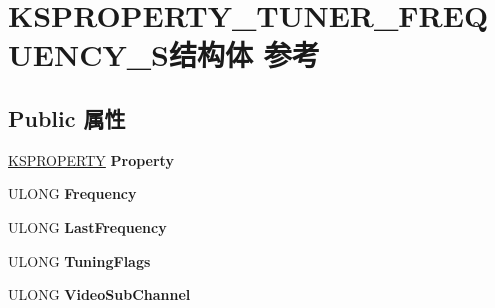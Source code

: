 \hypertarget{struct_k_s_p_r_o_p_e_r_t_y___t_u_n_e_r___f_r_e_q_u_e_n_c_y___s}{}\section{K\+S\+P\+R\+O\+P\+E\+R\+T\+Y\+\_\+\+T\+U\+N\+E\+R\+\_\+\+F\+R\+E\+Q\+U\+E\+N\+C\+Y\+\_\+\+S结构体 参考}
\label{struct_k_s_p_r_o_p_e_r_t_y___t_u_n_e_r___f_r_e_q_u_e_n_c_y___s}
\subsection*{Public 属性}
\begin{DoxyCompactItemize}
\item 
\mbox{\label{struct_k_s_p_r_o_p_e_r_t_y___t_u_n_e_r___f_r_e_q_u_e_n_c_y___s_a9497b71ece9c65a3ceabb0eed8534bf5}} 
\hyperlink{struct_k_s_i_d_e_n_t_i_f_i_e_r}{K\+S\+P\+R\+O\+P\+E\+R\+TY} {\bfseries Property}
\item 
\mbox{\label{struct_k_s_p_r_o_p_e_r_t_y___t_u_n_e_r___f_r_e_q_u_e_n_c_y___s_aff49d98710f9c21f31762d8816f38e0e}} 
U\+L\+O\+NG {\bfseries Frequency}
\item 
\mbox{\label{struct_k_s_p_r_o_p_e_r_t_y___t_u_n_e_r___f_r_e_q_u_e_n_c_y___s_a81eb32f796deb1338423d841d69f741d}} 
U\+L\+O\+NG {\bfseries Last\+Frequency}
\item 
\mbox{\label{struct_k_s_p_r_o_p_e_r_t_y___t_u_n_e_r___f_r_e_q_u_e_n_c_y___s_a6517f868ad48b828a00cfe82fbcf9068}} 
U\+L\+O\+NG {\bfseries Tuning\+Flags}
\item 
\mbox{\label{struct_k_s_p_r_o_p_e_r_t_y___t_u_n_e_r___f_r_e_q_u_e_n_c_y___s_a2303f094bba28a9e732222b4c7896478}} 
U\+L\+O\+NG {\bfseries Video\+Sub\+Channel}
\item 
\mbox{\label{struct_k_s_p_r_o_p_e_r_t_y___t_u_n_e_r___f_r_e_q_u_e_n_c_y___s_a1c1e6a5761b33437a6c8a26817d08ae0}} 

\end{DoxyCompactItemize}

